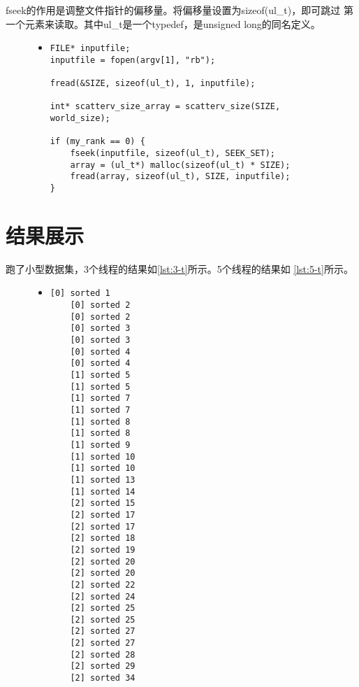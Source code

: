 \documentclass[a4paper]{article}
\begin{document}
fseek的作用是调整文件指针的偏移量。将偏移量设置为sizeof(ul\_t)，即可跳过
第一个元素来读取。其中ul\_t是一个typedef，是unsigned long的同名定义。
\begin{figure}[!hbt]
\begin{itemize}
\item[] \begin{lstlisting}[style=mycpp, label=lst:readdata, caption=读取数据的代码]
FILE* inputfile;
inputfile = fopen(argv[1], "rb");

fread(&SIZE, sizeof(ul_t), 1, inputfile);

int* scatterv_size_array = scatterv_size(SIZE, world_size);

if (my_rank == 0) {
    fseek(inputfile, sizeof(ul_t), SEEK_SET);
    array = (ul_t*) malloc(sizeof(ul_t) * SIZE);
    fread(array, sizeof(ul_t), SIZE, inputfile);
}
\end{lstlisting}
\end{itemize}
\end{figure}


\section{结果展示}
跑了小型数据集，3个线程的结果如\autoref{lst:3-t}所示。5个线程的结果如
\autoref{lst:5-t}所示。
\begin{figure}[!hbt]
\begin{itemize}
\item[] \begin{lstlisting}[style=mycpp, label=lst:3-t, caption=三线程结果]
    [0] sorted 1
    [0] sorted 2
    [0] sorted 2
    [0] sorted 3
    [0] sorted 3
    [0] sorted 4
    [0] sorted 4
    [1] sorted 5
    [1] sorted 5
    [1] sorted 7
    [1] sorted 7
    [1] sorted 8
    [1] sorted 8
    [1] sorted 9
    [1] sorted 10
    [1] sorted 10
    [1] sorted 13
    [1] sorted 14
    [2] sorted 15
    [2] sorted 17
    [2] sorted 17
    [2] sorted 18
    [2] sorted 19
    [2] sorted 20
    [2] sorted 20
    [2] sorted 22
    [2] sorted 24
    [2] sorted 25
    [2] sorted 25
    [2] sorted 27
    [2] sorted 27
    [2] sorted 28
    [2] sorted 29
    [2] sorted 34
\end{lstlisting}
\end{itemize}
\end{figure}
\end{document}
